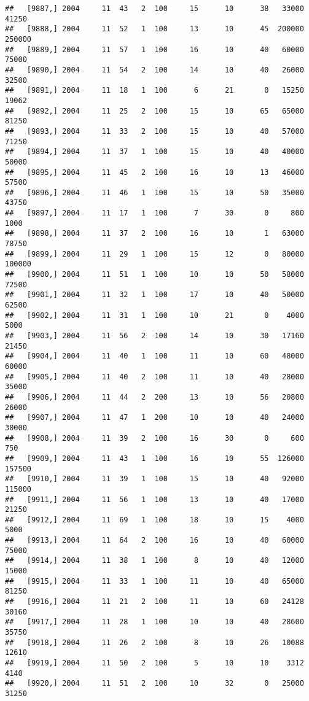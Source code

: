 \documentclass{article}\usepackage[]{graphicx}\usepackage[]{color}
\makeatletter
\newenvironment{kframe}{%
 \def\at@end@of@kframe{}%
 \ifinner\ifhmode%
  \def\at@end@of@kframe{\end{minipage}}%
  \begin{minipage}{\columnwidth}%
 \fi\fi%
 \def\FrameCommand##1{\hskip\@totalleftmargin \hskip-\fboxsep
 \colorbox{shadecolor}{##1}\hskip-\fboxsep
     \hskip-\linewidth \hskip-\@totalleftmargin \hskip\columnwidth}%
 \MakeFramed {\advance\hsize-\width
   \@totalleftmargin\z@ \linewidth\hsize
   \@setminipage}}%
 {\par\unskip\endMakeFramed%
 \at@end@of@kframe}
\newenvironment{knitrout}{}{} %
\makeatother
\begin{document}
\begin{knitrout}
\begin{kframe}
\begin{verbatim}
##   [9887,] 2004     11  43   2  100     15      10      38   33000   41250
##   [9888,] 2004     11  52   1  100     13      10      45  200000  250000
##   [9889,] 2004     11  57   1  100     16      10      40   60000   75000
##   [9890,] 2004     11  54   2  100     14      10      40   26000   32500
##   [9891,] 2004     11  18   1  100      6      21       0   15250   19062
##   [9892,] 2004     11  25   2  100     15      10      65   65000   81250
##   [9893,] 2004     11  33   2  100     15      10      40   57000   71250
##   [9894,] 2004     11  37   1  100     15      10      40   40000   50000
##   [9895,] 2004     11  45   2  100     16      10      13   46000   57500
##   [9896,] 2004     11  46   1  100     15      10      50   35000   43750
##   [9897,] 2004     11  17   1  100      7      30       0     800    1000
##   [9898,] 2004     11  37   2  100     16      10       1   63000   78750
##   [9899,] 2004     11  29   1  100     15      12       0   80000  100000
##   [9900,] 2004     11  51   1  100     10      10      50   58000   72500
##   [9901,] 2004     11  32   1  100     17      10      40   50000   62500
##   [9902,] 2004     11  31   1  100     10      21       0    4000    5000
##   [9903,] 2004     11  56   2  100     14      10      30   17160   21450
##   [9904,] 2004     11  40   1  100     11      10      60   48000   60000
##   [9905,] 2004     11  40   2  100     11      10      40   28000   35000
##   [9906,] 2004     11  44   2  200     13      10      56   20800   26000
##   [9907,] 2004     11  47   1  200     10      10      40   24000   30000
##   [9908,] 2004     11  39   2  100     16      30       0     600     750
##   [9909,] 2004     11  43   1  100     16      10      55  126000  157500
##   [9910,] 2004     11  39   1  100     15      10      40   92000  115000
##   [9911,] 2004     11  56   1  100     13      10      40   17000   21250
##   [9912,] 2004     11  69   1  100     18      10      15    4000    5000
##   [9913,] 2004     11  64   2  100     16      10      40   60000   75000
##   [9914,] 2004     11  38   1  100      8      10      40   12000   15000
##   [9915,] 2004     11  33   1  100     11      10      40   65000   81250
##   [9916,] 2004     11  21   2  100     11      10      60   24128   30160
##   [9917,] 2004     11  28   1  100     10      10      40   28600   35750
##   [9918,] 2004     11  26   2  100      8      10      26   10088   12610
##   [9919,] 2004     11  50   2  100      5      10      10    3312    4140
##   [9920,] 2004     11  51   2  100     10      32       0   25000   31250

\end{verbatim}
\end{kframe}
\end{knitrout}
\end{document}
